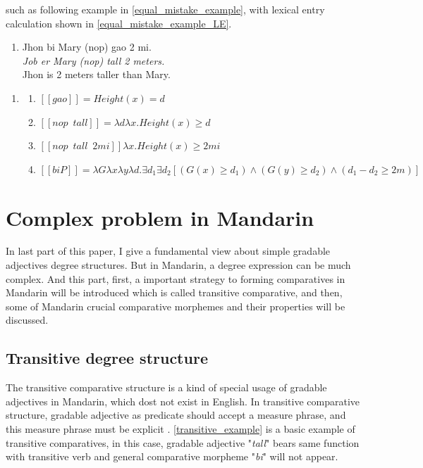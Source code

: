 \documentclass{ctexart}
\let \cite \parencite
\begin{document}
such as following example in \ref{equal_mistake_example}, with lexical entry calculation shown in \ref{equal_mistake_example_LE}.

\begin{enumerate}[resume]
    \item \label{equal_mistake_example}
    Jhon bi Mary (nop) gao 2 mi. \\
    \textit{Job er Mary (nop) tall 2 meters.}    \\
    Jhon is 2 meters taller than Mary.
\end{enumerate}

\begin{enumerate}[resume]
    \item \label{equal_mistake_example_LE}
    \begin{enumerate}[ref=(\arabic{enumi}\alph*)]
        \item $[\![gao]\!]=Height(x)=d$
        \item $[\![nop \enspace tall]\!] = \lambda d \lambda x.Height(x) \geq d$
        \item $[\![nop \enspace tall \enspace 2mi]\!] \lambda x.Height(x) \geq 2mi$ 
        \item $[\![biP]\!]=\lambda G \lambda x \lambda y \lambda d. \exists d_1 \exists d_2 [(G(x) \geq d_1) \land (G(y) \geq d_2) \land (d_1-d_2 \geq 2m) ]$
    \end{enumerate}
\end{enumerate} 

\section{Complex problem in Mandarin}

In last part of this paper, I give a fundamental view about simple gradable adjectives degree structures. But in Mandarin, a degree expression can be much complex. And this part, first, a important strategy to forming comparatives in Mandarin will be introduced which is called transitive comparative, and then, some of Mandarin crucial comparative morphemes and their properties will be discussed.

\subsection{Transitive degree structure}

The transitive comparative structure is a kind of special usage of gradable adjectives in Mandarin, which dost not exist in English. In transitive comparative structure, gradable adjective as predicate should accept a measure phrase, and this measure phrase must be explicit \cite{grano2012}. \ref{transitive_example} is a basic example of transitive comparatives, in this case, gradable adjective "\textit{tall}" bears same function with transitive verb and general comparative morpheme "\textit{bi}" will not appear. 
\end{document}
